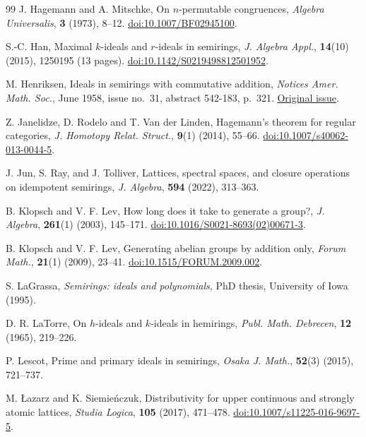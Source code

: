 \documentclass[12pt,english]{amsart}
\theoremstyle{definition}
\numberwithin{equation}{section}
\theoremstyle{remark}
\begin{document}
\begin{thebibliography}{99}
J. Hagemann and A. Mitschke, On $n$-permutable congruences,
\textit{Algebra Universalis}, \textbf{3} (1973), 8--12.
\href{https://doi.org/10.1007/BF02945100}{doi:10.1007/BF02945100}.

S.-C. Han, Maximal $k$-ideals and $r$-ideals in semirings, \textit{J. Algebra Appl.},
\textbf{14}(10) (2015), 1250195 (13 pages).
\href{https://doi.org/10.1142/S0219498812501952}{doi:10.1142/S0219498812501952}.

M. Henriksen, Ideals in semirings with commutative addition,
\textit{Notices Amer. Math. Soc.}, June 1958, issue no.~31, abstract 542-183, p.~321.
\href{https://www.ams.org/journals/notices/195806/195806FullIssue.pdf}{Original issue}.

Z. Janelidze, D. Rodelo and T. Van der Linden, Hagemann's theorem for regular categories,
\textit{J. Homotopy Relat. Struct.}, \textbf{9}(1) (2014), 55--66.
\href{https://doi.org/10.1007/s40062-013-0044-5}{doi:10.1007/s40062-013-0044-5}.

J. Jun, S. Ray, and J. Tolliver, Lattices, spectral spaces, and closure operations on
idempotent semirings, \textit{J. Algebra}, \textbf{594} (2022), 313--363.

B. Klopsch and V. F. Lev, How long does it take to generate a group?,
\textit{J. Algebra}, \textbf{261}(1) (2003), 145--171.
\href{https://doi.org/10.1016/S0021-8693(02)00671-3}{doi:10.1016/S0021-8693(02)00671-3}.

B. Klopsch and V. F. Lev, Generating abelian groups by addition only,
\textit{Forum Math.}, \textbf{21}(1) (2009), 23--41.
\href{https://doi.org/10.1515/FORUM.2009.002}{doi:10.1515/FORUM.2009.002}.

S. LaGrassa, \textit{Semirings: ideals and polynomials}, PhD thesis, University of Iowa (1995).

D. R. LaTorre, On $h$-ideals and $k$-ideals in hemirings, \textit{Publ. Math. Debrecen}, \textbf{12} (1965),
219--226.

P. Lescot, Prime and primary ideals in semirings, \textit{Osaka J. Math.}, \textbf{52}(3) (2015), 721--737.

M. \L azarz and K. Siemie\'nczuk, Distributivity for upper continuous
and strongly atomic lattices, \textit{Studia Logica},
\textbf{105} (2017), 471--478.
\href{https://doi.org/10.1007/s11225-016-9697-5}{doi:10.1007/s11225-016-9697-5}.


\end{thebibliography}
\end{document}
